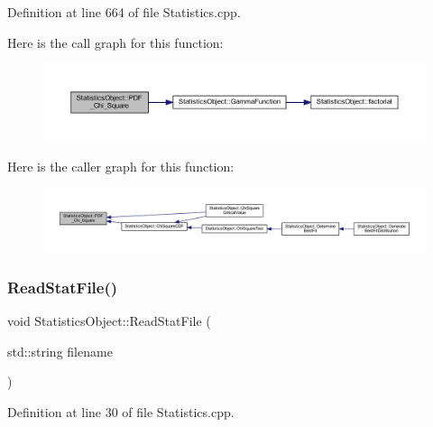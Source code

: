 Definition at line 664 of file Statistics.\+cpp.

Here is the call graph for this function\+:
\nopagebreak
\begin{figure}[H]
\begin{center}
\leavevmode
\includegraphics[width=350pt]{class_statistics_object_aec6848499139f4811fd4f2f60a252a9f_cgraph}
\end{center}
\end{figure}
Here is the caller graph for this function\+:
\nopagebreak
\begin{figure}[H]
\begin{center}
\leavevmode
\includegraphics[width=350pt]{class_statistics_object_aec6848499139f4811fd4f2f60a252a9f_icgraph}
\end{center}
\end{figure}
\mbox{\label{class_statistics_object_a693fe5171d536953cc5545048716dcca}} 
\subsubsection{\texorpdfstring{Read\+Stat\+File()}{ReadStatFile()}}
{\footnotesize\ttfamily void Statistics\+Object\+::\+Read\+Stat\+File (\begin{DoxyParamCaption}\item[{std\+::string}]{filename }\end{DoxyParamCaption})}



Definition at line 30 of file Statistics.\+cpp.

